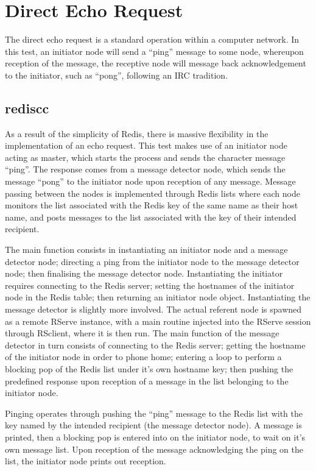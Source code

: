 \documentclass[10pt,a4paper]{article}
\begin{document}
\section{Direct Echo Request}
The direct echo request is a standard operation within a computer network\cite{rfc1122}.
In this test, an initiator node will send a ``ping'' message to some node, whereupon reception of the message, the receptive node will message back acknowledgement to the initiator, such as ``pong'', following an IRC tradition\cite{rfc1459}.

\subsection{rediscc}
As a result of the simplicity of Redis, there is massive flexibility in the implementation of an echo request.
This test makes use of an initiator node acting as master, which starts the process and sends the character message ``ping''. The response comes from a message detector node, which sends the message ``pong'' to the initiator node upon reception of any message.
Message passing between the nodes is implemented through Redis lists where each node monitors the list associated with the Redis key of the same name as their host name, and posts messages to the list associated with the key of their intended recipient.

The main function consists in instantiating an initiator node and a message detector node; directing a ping from the initiator node to the message detector node; then finalising the message detector node.
Instantiating the initiator requires connecting to the Redis server; setting the hostnames of the initiator node in the Redis table; then returning an initiator node object.
Instantiating the message detector is slightly more involved. The actual referent node is spawned as a remote RServe instance, with a main routine injected into the RServe session through RSclient, where it is then run.
The main function of the message detector in turn consists of connecting to the Redis server; getting the hostname of the initiator node in order to phone home; entering a loop to perform a blocking pop of the Redis list under it's own hostname key; then pushing the predefined response upon reception of a message in the list belonging to the initiator node.

Pinging operates through pushing the ``ping'' message to the Redis list with the key named by the intended recipient (the message detector node). 
A message is printed, then a blocking pop is entered into on the initiator node, to wait on it's own message list. 
Upon reception of the message acknowledging the ping on the list, the initiator node prints out reception.
\end{document}
